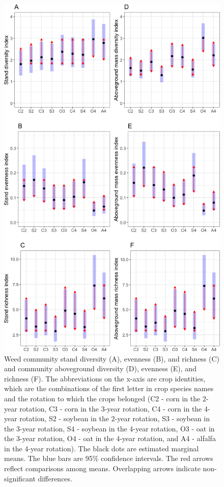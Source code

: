 \documentclass[
]{article}
\begin{document}
\begin{figure}
\centering
\includegraphics{Manuscript_whole_files/figure-latex/index-arrow-p-1.png}
\caption{\label{fig:index-arrow-p}Weed community stand diversity (A), evenness (B), and richness (C) and community aboveground diversity (D), evenness (E), and richness (F). The abbreviations on the x-axis are crop identities, which are the combinations of the first letter in crop species names and the rotation to which the crops belonged (C2 - corn in the 2-year rotation, C3 - corn in the 3-year rotation, C4 - corn in the 4-year rotation, S2 - soybean in the 2-year rotation, S3 - soybean in the 3-year rotation, S4 - soybean in the 4-year rotation, O3 - oat in the 3-year rotation, O4 - oat in the 4-year rotation, and A4 - alfalfa in the 4-year rotation). The black dots are estimated marginal means. The blue bars are 95\% confidence intervals. The red arrows reflect comparisons among means. Overlapping arrows indicate non-significant differences.}
\end{figure}
\end{document}

